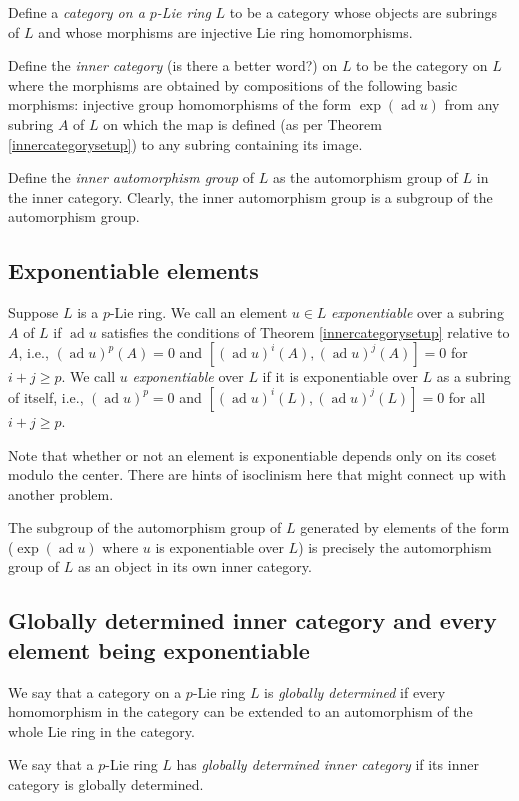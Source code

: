 \documentclass[10pt]{amsart}
\newcommand{\ad}{\operatorname{ad}}
\begin{document}
Define a {\em category on a $p$-Lie ring} $L$ to be a category whose
objects are subrings of $L$ and whose morphisms are injective Lie ring
homomorphisms.

Define the {\em inner category} (is there a better word?) on $L$ to be
the category on $L$ where the morphisms are obtained by compositions
of the following basic morphisms: injective group homomorphisms of the
form $\exp(\ad u)$ from any subring $A$ of $L$ on which the map is
defined (as per Theorem \ref{innercategorysetup}) to any subring
containing its image.

Define the {\em inner automorphism group} of $L$ as the automorphism
group of $L$ in the inner category. Clearly, the inner automorphism
group is a subgroup of the automorphism group.

\subsection{Exponentiable elements}

Suppose $L$ is a $p$-Lie ring. We call an element $u \in L$ {\em
  exponentiable} over a subring $A$ of $L$ if $\ad u$ satisfies the
conditions of Theorem \ref{innercategorysetup} relative to $A$, i.e.,
$(\ad u)^p(A) = 0$ and $[(\ad u)^i(A),(\ad u)^j(A)] = 0$ for $i + j
\ge p$. We call $u$ {\em exponentiable} over $L$ if it is
exponentiable over $L$ as a subring of itself, i.e., $(\ad u)^p = 0$
and $[(\ad u)^i(L),(\ad u)^j(L)] = 0$ for all $i + j \ge p$.

Note that whether or not an element is exponentiable depends only on
its coset modulo the center. There are hints of isoclinism here that
might connect up with another problem.

The subgroup of the automorphism group of $L$ generated by elements of
the form ($\exp(\ad u)$ where $u$ is exponentiable over $L$) is
precisely the automorphism group of $L$ as an object in its own inner
category.

\subsection{Globally determined inner category and every element being exponentiable}

We say that a category on a $p$-Lie ring $L$ is {\em globally
determined} if every homomorphism in the category can be extended to
an automorphism of the whole Lie ring in the category.

We say that a $p$-Lie ring $L$ has {\em globally determined inner
category} if its inner category is globally determined.
\end{document}
